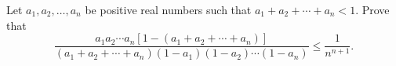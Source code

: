 Let $a_1, a_2, \ldots, a_n$ be positive real numbers such that $a_1 + a_2 + \cdots + a_n < 1$. Prove that
\[ \frac{a_1 a_2 \cdots a_n [1 - (a_1 + a_2 + \cdots + a_n)]}{(a_1 + a_2 + \cdots + a_n)(1 - a_1)(1 - a_2) \cdots (1 - a_n)} \leq \frac{1}{n^{n+1}}. \]
